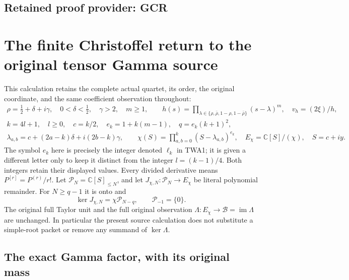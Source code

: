 \documentclass[11pt,a4paper]{article}
\begin{document}

\clearpage
\subsection*{Retained proof provider: GCR}

\section{The finite Christoffel return to the original tensor Gamma source}
\label{sec:gcr-finite-christoffel-return}

This calculation retains the complete actual quartet, its order, the
original coordinate, and the same coefficient observation throughout:
\[
\begin{gathered}
 \rho=\tfrac12+\delta+i\gamma,\quad 0<\delta<\tfrac12,\quad
 \gamma>2,\quad m\geq1,\qquad
 h(s)=\prod_{\lambda\in\{\rho,\bar\rho,1-\rho,1-\bar\rho\}}
                  (s-\lambda)^m,\quad v_h=(2\xi)/h,\\
 k=4l+1,\quad l\geq0,\quad c=k/2,\quad
 e_k=1+k(m-1),\quad q=e_k(k+1)^2,\\
 \lambda_{a,b}=c+(2a-k)\delta+i(2b-k)\gamma,\qquad
 \chi(S)=\prod_{a,b=0}^k(S-\lambda_{a,b})^{e_k},
 \quad E_\chi=\mathbb C[S]/(\chi),\quad S=c+iy.
\end{gathered}\tag{GCR1}
\]
The symbol $e_k$ here is precisely the integer denoted $\ell_k$ in
TWA1; it is given a different letter only to keep it distinct from
the integer $l=(k-1)/4$. Both integers retain their displayed values.
Every divided derivative means $P^{[r]}=P^{(r)}/r!$.
Let $\mathcal P_N=\mathbb C[S]_{\leq N}$, and let
$J_{\chi,N}:\mathcal P_N\to E_\chi$ be literal polynomial remainder.
For $N\geq q-1$ it is onto and
\[
 \ker J_{\chi,N}=\chi\mathcal P_{N-q},\qquad
 \mathcal P_{-1}=\{0\}.
\tag{GCR2}
\]
The original full Taylor unit and the full original observation
$\Lambda:E_\chi\to\mathcal B=\operatorname{im}\Lambda$ are unchanged.
In particular the present source calculation does not substitute a
simple-root packet or remove any summand of $\ker\Lambda$.

\subsection{The exact Gamma factor, with its original mass}
\end{document}
